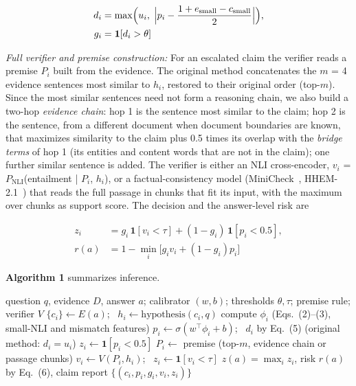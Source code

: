 \documentclass[conference]{IEEEtran}
\begin{document}
\begin{equation}
\begin{aligned}d_i&=\max\Bigl(u_i,\;\Bigl|p_i-\frac{1+e_{\mathrm{small}}-c_{\mathrm{small}}}{2}\Bigr|\Bigr),\\ g_i&=\mathbf{1}[d_i>\theta]\end{aligned}
\label{eq:e5}
\end{equation}

\textit{Full verifier and premise construction:} For an escalated claim the verifier reads a premise $P_{i}$ built from the evidence. The original method concatenates the $m$ = 4 evidence sentences most similar to $h_{i}$, restored to their original order (top-$m$). Since the most similar sentences need not form a reasoning chain, we also build a two-hop \textit{evidence chain}: hop 1 is the sentence most similar to the claim; hop 2 is the sentence, from a different document when document boundaries are known, that maximizes similarity to the claim plus 0.5 times its overlap with the \textit{bridge terms} of hop 1 (its entities and content words that are not in the claim); one further similar sentence is added. The verifier is either an NLI cross-encoder, $v_{i}$ = $P_{\mathrm{NLI}}$(entailment | $P_{i}$, $h_{i}$), or a factual-consistency model (MiniCheck~\cite{tang_minicheck}, HHEM-2.1~\cite{vectara_hhem}) that reads the full passage in chunks that fit its input, with the maximum over chunks as support score. The decision and the answer-level risk are

\begin{equation}
\begin{aligned}z_i&=g_i\,\mathbf{1}[v_i<\tau]+(1-g_i)\,\mathbf{1}[p_i<0.5],\\ r(a)&=1-\min_i\bigl[g_iv_i+(1-g_i)p_i\bigr]\end{aligned}
\label{eq:e6}
\end{equation}

\textbf{Algorithm 1} summarizes inference.

\begin{algorithm}[t]
\caption{Adaptive claim-level verification (inference for one answer)}
\label{alg:verify}
\begin{algorithmic}[1]
\Require question $q$, evidence $D$, answer $a$; calibrator $(w,b)$; thresholds $\theta,\tau$; premise rule; verifier $V$
\State $\{c_i\}\gets E(a)$; \ $h_i\gets\mathrm{hypothesis}(c_i,q)$
  \State compute $\phi_i$ (Eqs.~(2)--(3), small-NLI and mismatch features)
  \State $p_i\gets\sigma(w^{\top}\phi_i+b)$; \ $d_i$ by Eq.~(5) (original method: $d_i=u_i$)
    \State $z_i\gets\mathbf{1}[p_i<0.5]$ 
  \Else
    \State $P_i\gets$ premise (top-$m$, evidence chain or passage chunks)
    \State $v_i\gets V(P_i,h_i)$; \ $z_i\gets\mathbf{1}[v_i<\tau]$
  \EndIf
\EndFor
\State \Return $z(a)=\max_i z_i$, risk $r(a)$ by Eq.~(6), claim report $\{(c_i,p_i,g_i,v_i,z_i)\}$
\end{algorithmic}
\end{algorithm}
\end{document}
